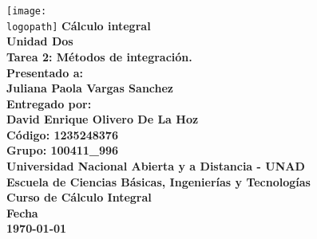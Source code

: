 \begin{titlepage}
    \begin{center}
        \texttt{[image: \\logopath]}
        \textbf{Cálculo integral\\}
        \vspace*{1cm}
        \textbf{
            Unidad Dos\\
            Tarea 2: Métodos de integración.\\
        }
        \vspace*{1cm}
        \textbf{
            Presentado a:\\
            Juliana Paola Vargas Sanchez\\
        }
        \vspace*{1cm}
        \textbf{Entregado por:\\}
        \vspace*{1cm}
        \textbf{
            David Enrique Olivero De La Hoz\\
            Código: 1235248376\\
            Grupo: 100411\_996\\
        }
        \vspace*{3cm}
        \textbf{
            Universidad Nacional Abierta y a Distancia - UNAD\\
            Escuela de Ciencias Básicas, Ingenierías y Tecnologías\\ 
            Curso de Cálculo Integral\\ 
            Fecha\\
            \today
        }
    \end{center}
\end{titlepage}